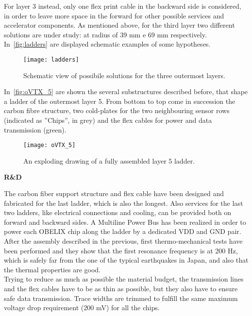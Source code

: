 For layer 3 instead, only one flex print cable in the backward side is considered, in order to leave more space in the forward for other possible services and accelerator components. As mentioned above, for the third layer two different solutions are under study: at radius of 39 mm e 69 mm respectively. 
In~\autoref{fig:ladders} are displayed schematic examples of some hypotheses. 

\begin{figure}[h!]
\centering
\texttt{[image: ladders]}
\caption{Schematic view of possibile solutions for the three outermost layers.}
\label{fig:ladders}
\end{figure}


In~\autoref{fig:oVTX_5} are shown the several substructures described before, that shape a ladder of the outermost layer 5. From bottom to top come in succession the carbon fibre structure, two cold-plates for the two neighbouring sensor rows (indicated as ''Chips'', in grey) and the flex cables for power and data transmission (green). 


\begin{figure}[h!]
\centering
\texttt{[image: oVTX\_5]}
\caption{An exploding drawing of a fully assembled layer 5 ladder.}
\label{fig:oVTX_5}
\end{figure}

\begin{description}
\item \textbf{R\&D}
\end{description}

The carbon fiber support structure and flex cable have been designed and fabricated for the last ladder, which is also the longest. Also services for the last two ladders, like electrical connections and cooling, can be provided both on forward and backward sides.
A Multiline Power Bus has been realized in order to power each OBELIX chip along the ladder by a dedicated VDD and GND pair. \\

After the assembly described in the previous, first thermo-mechanical tests have been performed and they show that the first resonance frequency is at 200 Hz, which is safely far from the one of the typical earthquakes in Japan, and also that the thermal properties are good.\\

Trying to reduce as much as possible the material budget, the transmission lines and the flex cables have to be as thin as possible, but they also have to ensure safe data transmission. Trace widths are trimmed to fulfill the same maximum voltage drop requirement (200 mV) for all the chips.

